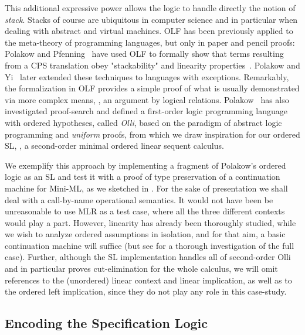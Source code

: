 \documentclass[final]{svjour3}
\begin{document}
This additional expressive power allows the logic to handle directly
the notion of \emph{stack}.  Stacks of course are ubiquitous in
computer science and in particular when dealing with abstract and
virtual machines.  OLF has been previously applied to the meta-theory
of programming languages, but only in paper and pencil proofs: Polakow
and Pfenning~\cite{Polakow00lfm} have used OLF to formally show that
terms resulting from a CPS translation obey "stackability" and
linearity properties~\cite{Danvy99hoots}.  Polakow and
Yi~\cite{PolakowYi01flops} later extended these techniques to
languages with exceptions.  Remarkably, the formalization in OLF
provides a simple proof of what is usually demonstrated via more
complex means, \ie, an argument by logical relations.
Polakow~\cite{Polakow01phd} has also investigated proof-search and
defined a first-order logic programming language with ordered
hypotheses, called \emph{Olli}, based on the paradigm of abstract
logic programming and \emph{uniform} proofs, from which we draw
inspiration for our ordered SL, \ie, a second-order minimal ordered
linear sequent calculus.

We exemplify this approach by implementing a fragment of Polakow's
ordered logic as an SL and test it with a proof of type preservation
of a continuation machine for Mini-ML, as we sketched in
\cite{MomiglianoP03}.  For the sake of presentation we shall deal with
a call-by-name operational semantics.
It would not have been be unreasonable to use MLR as a test case,
where all the three different contexts would play a part. However,
linearity has already been thoroughly studied, while we wish to
analyze ordered assumptions in isolation, and for that aim, a basic
continuation machine will suffice (but see \cite{MartinCase} for a
thorough investigation of the full case).  Further, although the SL
implementation handles all of second-order Olli and in particular
proves cut-elimination for the whole calculus, we will omit references
to the (unordered) linear context and linear implication,
as well as to the ordered left implication, since they do not play any
role in this case-study.


\subsection{Encoding the Specification Logic}
\label{ssec:oseq}
\end{document}
